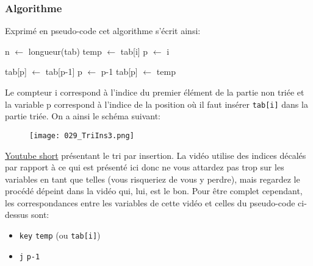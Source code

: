 \documentclass[12pt]{article}
\begin{document}
	\subsubsection*{Algorithme}
	\begin{MaReponse}
		Exprimé en pseudo-code cet algorithme s'écrit ainsi:
		
		\begin{algorithmic}[1]
			\State n $\leftarrow$ longueur(tab)
			\State temp $\leftarrow$ tab[i]
			\State p $\leftarrow$ i
			
			\State tab[p] $\leftarrow$ tab[p-1]
			\State p $\leftarrow$ p-1
			\EndWhile
			\State tab[p] $\leftarrow$ temp
			\EndFor
			\State{}
			\EndFunction
		\end{algorithmic}
		
		Le compteur i correspond à l'indice du premier élément de la partie non triée et la variable p correspond à l'indice de la position où il faut insérer \texttt{tab[i]} dans la partie triée. On a ainsi le schéma suivant:
		\begin{figure}[H]
			\centering
			\texttt{[image: 029\_TriIns3.png]}
		\end{figure}
	\end{MaReponse}
	
	\begin{MaVid}
		\href{https://www.youtube.com/shorts/ZZ-Oz1IFfPg?feature=share}{Youtube short} présentant le tri par insertion. La vidéo utilise des indices décalés par rapport à ce qui est présenté ici donc ne vous attardez pas trop sur les variables en tant que telles (vous risqueriez de vous y perdre), mais regardez le procédé dépeint dans la vidéo qui, lui, est le bon. Pour être complet cependant, les correspondances entre les variables de cette vidéo et celles du pseudo-code ci-dessus sont:
		\begin{itemize}
			\item \texttt{key} \quad \faExchange \quad \texttt{temp} (ou \texttt{tab[i]})
			\item \texttt{j} \quad \faExchange \quad \texttt{p-1}
		\end{itemize}
	\end{MaVid}
	
\end{document}
